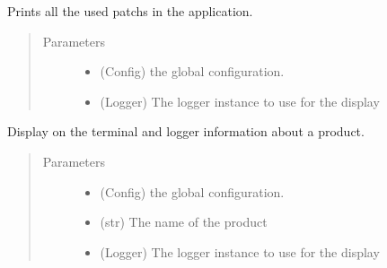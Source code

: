 \documentclass[a4paper,10pt,english]{sphinxmanual}
\begin{document}
\begin{fulllineitems}
\label{\detokenize{apidoc_src/src:src.configManager.show_patchs}}
Prints all the used patchs in the application.
\begin{quote}\begin{description}
\item[{Parameters}] \leavevmode\begin{itemize}
\item {} 
 \textendash{} (Config) the global configuration.

\item {} 
 \textendash{} (Logger) 
The logger instance to use for the display

\end{itemize}

\end{description}\end{quote}

\end{fulllineitems}


\begin{fulllineitems}
\label{\detokenize{apidoc_src/src:src.configManager.show_product_info}}
Display on the terminal and logger information about a product.
\begin{quote}\begin{description}
\item[{Parameters}] \leavevmode\begin{itemize}
\item {} 
 \textendash{} (Config) the global configuration.

\item {} 
 \textendash{} (str) The name of the product

\item {} 
 \textendash{} (Logger) The logger instance to use for the display

\end{itemize}

\end{description}\end{quote}

\end{fulllineitems}
\end{document}
